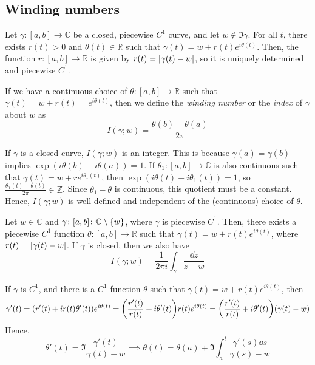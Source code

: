 \subsection{Winding numbers}
Let \( \gamma \colon [a,b] \to \mathbb C \) be a closed, piecewise \( C^1 \) curve, and let \( w \not\in \Im \gamma \).
For all \( t \), there exists \( r(t) > 0 \) and \( \theta(t) \in \mathbb R \) such that \( \gamma(t) = w + r(t) e^{i\theta(t)} \).
Then, the function \( r \colon [a,b] \to \mathbb R \) is given by \( r(t) = \abs{\gamma(t) - w} \), so it is uniquely determined and piecewise \( C^1 \).
\begin{definition}
	If we have a continuous choice of \( \theta \colon [a,b] \to \mathbb R \) such that \( \gamma(t) = w + r(t) = e^{i\theta(t)} \), then we define the \textit{winding number} or the \textit{index} of \( \gamma \) about \( w \) as
	\[
		I(\gamma; w) = \frac{\theta(b) - \theta(a)}{2\pi}
	\]
\end{definition}
If \( \gamma \) is a closed curve, \( I(\gamma;w) \) is an integer.
This is because \( \gamma(a) = \gamma(b) \) implies \( \exp(i\theta(b) - i\theta(a)) = 1 \).
If \( \theta_1 \colon [a,b] \to \mathbb C \) is also continuous such that \( \gamma(t) = w + re^{i\theta_1(t)} \), then \( \exp(i\theta(t) - i\theta_1(t)) = 1 \), so \( \frac{\theta_1(t) - \theta(t)}{2\pi} \in \mathbb Z \).
Since \( \theta_1 - \theta \) is continuous, this quotient must be a constant.
Hence, \( I(\gamma;w) \) is well-defined and independent of the (continuous) choice of \( \theta \).
\begin{lemma}
	Let \( w \in \mathbb C \) and \( \gamma \colon [a,b] \colon \mathbb C \setminus \qty{w} \), where \( \gamma \) is piecewise \( C^1 \).
	Then, there exists a piecewise \( C^1 \) function \( \theta \colon [a,b] \to \mathbb R \) such that \( \gamma(t) = w + r(t) e^{i\theta(t)} \), where \( r(t) = \abs{\gamma(t) - w} \).
	If \( \gamma \) is closed, then we also have
	\[
		I(\gamma; w) = \frac{1}{2\pi i} \int_\gamma \frac{\dd{z}}{z-w}
	\]
\end{lemma}
\begin{remark}
	If \( \gamma \) is \( C^1 \), and there is a \( C^1 \) function \( \theta \) such that \( \gamma(t) = w + r(t) e^{i\theta(t)} \), then
	\[
		\gamma'(t) = (r'(t) + ir(t) \theta'(t))e^{i\theta(t)} = \qty(\frac{r'(t)}{r(t)} + i\theta'(t)) r(t) e^{i\theta(t)} = \qty(\frac{r'(t)}{r(t)} + i\theta'(t))(\gamma(t) - w)
	\]
	Hence,
	\[
		\theta'(t) = \Im \frac{\gamma'(t)}{\gamma(t) - w} \implies \theta(t) = \theta(a) + \Im \int_a^t \frac{\gamma'(s) \dd{s}}{\gamma(s) - w}
	\]
\end{remark}
